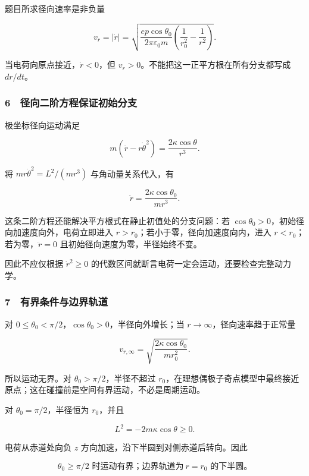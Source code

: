 \documentclass[12pt,a4paper,fontset=fandol]{ctexart}
\begin{document}
题目所求径向速率是非负量

\[\boxed{v_r=|\dot r|=
\sqrt{\frac{ep\cos\theta_0}{2\pi\varepsilon_0m}
\left(\frac1{r_0^2}-\frac1{r^2}\right)}.}\]

当电荷向原点接近，\(\dot r<0\)，但
\(v_r>0\)。不能把这一正平方根在所有分支都写成 \(dr/dt\)。

\subsubsection{6　径向二阶方程保证初始分支}\label{ux5f84ux5411ux4e8cux9636ux65b9ux7a0bux4fddux8bc1ux521dux59cbux5206ux652f}

极坐标径向运动满足

\[m(\ddot r-r\dot\theta^2)=\frac{2\kappa\cos\theta}{r^3}.\]

将 \(mr\dot\theta^2=L^2/(mr^3)\) 与角动量关系代入，有

\[\boxed{\ddot r=\frac{2\kappa\cos\theta_0}{mr^3}.}\]

这条二阶方程还能解决平方根式在静止初值处的分支问题：若
\(\cos\theta_0>0\)，初始径向加速度向外，电荷立即进入
\(r>r_0\)；若小于零，径向加速度向内，进入
\(r<r_0\)；若为零，\(\ddot r=0\) 且初始径向速度为零，半径始终不变。

因此不应仅根据 \(\dot r^2\ge0\)
的代数区间就断言电荷一定会运动，还要检查完整动力学。

\subsubsection{7　有界条件与边界轨道}\label{ux6709ux754cux6761ux4ef6ux4e0eux8fb9ux754cux8f68ux9053}

对 \(0\le\theta_0<\pi/2\)，\(\cos\theta_0>0\)，半径向外增长；当
\(r\to\infty\)，径向速率趋于正常量

\[v_{r,\infty}=\sqrt{\frac{2\kappa\cos\theta_0}{mr_0^2}}.\]

所以运动无界。对 \(\theta_0>\pi/2\)，半径不超过
\(r_0\)，在理想偶极子奇点模型中最终接近原点；这在碰撞前是空间有界运动，不必是周期运动。

对 \(\theta_0=\pi/2\)，半径恒为 \(r_0\)，并且

\[L^2=-2m\kappa\cos\theta\ge0.\]

电荷从赤道处向负 \(z\) 方向加速，沿下半圆到对侧赤道后转向。因此

\[\boxed{\theta_0\ge\pi/2\text{ 时运动有界；边界轨道为}\ r=r_0\text{ 的下半圆。}}\]
\end{document}
